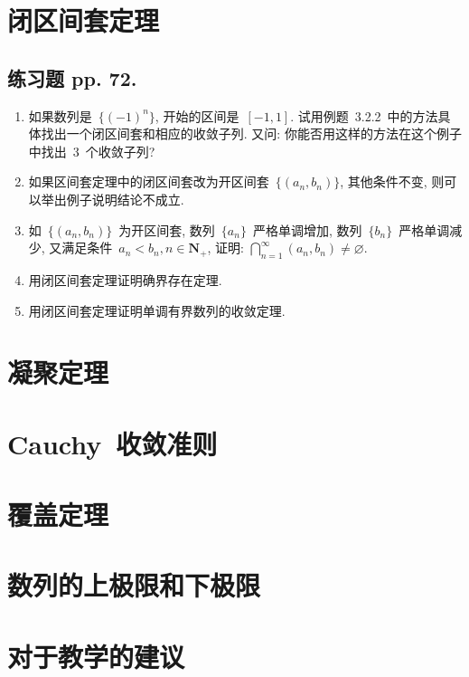 \documentclass[UTF8,a4paper,11pt,twoside]{book}
\begin{document}
\section{闭区间套定理}
\subsection{练习题 pp. 72.}
\begin{enumerate}
	\item 如果数列是~$\{(-1)^n\}$, 开始的区间是~$[-1,1]$. 试用例题~3.2.2~中的方法具体找出一个闭区间套和相应的收敛子列. 又问: 你能否用这样的方法在这个例子中找出~$3$~个收敛子列?

	\item 如果区间套定理中的闭区间套改为开区间套~$\{(a_n,b_n)\}$, 其他条件不变, 则可以举出例子说明结论不成立.

	\item 如~$\{(a_n,b_n)\}$~为开区间套, 数列~$\{a_n\}$~严格单调增加, 数列~$\{b_n\}$~严格单调减少, 又满足条件~$a_n<b_n, n\in\mathbf{N}_{+}$, 证明: $\bigcap_{n=1}^{\infty}(a_n,b_n)\neq\varnothing$.

	\item 用闭区间套定理证明确界存在定理.

	\item 用闭区间套定理证明单调有界数列的收敛定理.
\end{enumerate}
\section{凝聚定理}

\section{Cauchy~收敛准则}

\section{覆盖定理}

\section{数列的上极限和下极限}

\section{对于教学的建议}
\end{document}
